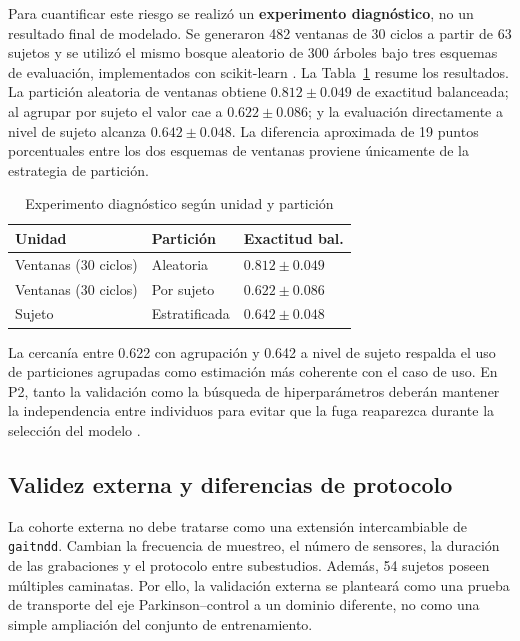 \documentclass[conference]{IEEEtran}
\begin{document}
Para cuantificar este riesgo se realizó un \textbf{experimento diagnóstico}, no un resultado final de modelado. Se generaron 482 ventanas de 30 ciclos a partir de 63 sujetos y se utilizó el mismo bosque aleatorio de 300 árboles bajo tres esquemas de evaluación, implementados con scikit-learn \cite{pedregosa2011}. La Tabla~\ref{tab:leakage} resume los resultados. La partición aleatoria de ventanas obtiene $0.812\pm0.049$ de exactitud balanceada; al agrupar por sujeto el valor cae a $0.622\pm0.086$; y la evaluación directamente a nivel de sujeto alcanza $0.642\pm0.048$. La diferencia aproximada de 19 puntos porcentuales entre los dos esquemas de ventanas proviene únicamente de la estrategia de partición.

\begin{table}[t]
\caption{Experimento diagnóstico según unidad y partición}
\label{tab:leakage}
\centering
\small
\begin{tabular}{lll}
\toprule
Unidad & Partición & Exactitud bal. \\
\midrule
Ventanas (30 ciclos) & Aleatoria & $0.812\pm0.049$ \\
Ventanas (30 ciclos) & Por sujeto & $0.622\pm0.086$ \\
Sujeto & Estratificada & $0.642\pm0.048$ \\
\bottomrule
\end{tabular}
\end{table}

La cercanía entre 0.622 con agrupación y 0.642 a nivel de sujeto respalda el uso de particiones agrupadas como estimación más coherente con el caso de uso. En P2, tanto la validación como la búsqueda de hiperparámetros deberán mantener la independencia entre individuos para evitar que la fuga reaparezca durante la selección del modelo \cite{varoquaux2018}.

\subsection{Validez externa y diferencias de protocolo}
La cohorte externa no debe tratarse como una extensión intercambiable de \texttt{gaitndd}. Cambian la frecuencia de muestreo, el número de sensores, la duración de las grabaciones y el protocolo entre subestudios. Además, 54 sujetos poseen múltiples caminatas. Por ello, la validación externa se planteará como una prueba de transporte del eje Parkinson--control a un dominio diferente, no como una simple ampliación del conjunto de entrenamiento.
\end{document}
